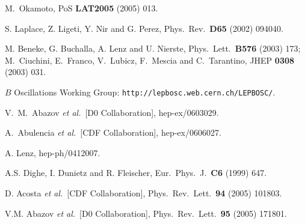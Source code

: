 \documentclass[12pt]{article}
\begin{document}
\begin{thebibliography}{999}
M.~Okamoto,
 { PoS {\bf LAT2005}} (2005) 013.

S. Laplace, Z. Ligeti, Y. Nir and G. Perez,
{Phys.\ Rev.}~{\bf D65} (2002) 094040.

M. Beneke, G. Buchalla, A. Lenz and U. Nierste,
{ Phys.\ Lett.}~{\bf B576} (2003) 173;\\
M.~Ciuchini, E.~Franco, V.~Lubicz, F.~Mescia and C.~Tarantino,
{ JHEP} {\bf 0308} (2003) 031.

$B$ Oscillations Working Group:
{\tt http://lepbosc.web.cern.ch/LEPBOSC/}.

 V.~M.~Abazov {\it et al.}\  [D0 Collaboration],
  hep-ex/0603029.

A.~Abulencia {\it et al.}\ [CDF Collaboration],
  hep-ex/0606027.
  
A. Lenz,
  hep-ph/0412007.
  
A.S. Dighe, I. Dunietz and R. Fleischer,
{ Eur.\ Phys.\ J.}~{\bf C6} (1999) 647.

D. Acosta {\it et al.}\  [CDF Collaboration],
  { Phys.\ Rev.\ Lett.}~{\bf 94} (2005) 101803.

V.M. Abazov {\it et al.}\  [D0 Collaboration],
  { Phys.\ Rev.\ Lett.}~{\bf 95} (2005) 171801.


\end{thebibliography}
\end{document}

